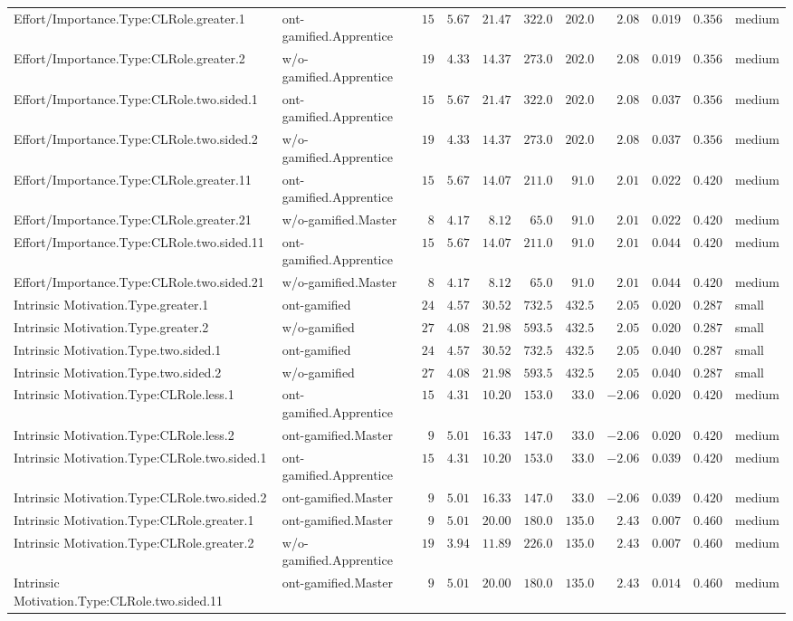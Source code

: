 \documentclass[6pt,a4paper]{article}
\begin{document}
\begin{landscape}
{\begin{longtable}{llrrrrrrrrl}
Effort/Importance.Type:CLRole.greater.1&ont-gamified.Apprentice&$15$&$5.67$&$21.47$&$322.0$&$202.0$&$ 2.08$&$0.019$&$0.356$&medium\tabularnewline
Effort/Importance.Type:CLRole.greater.2&w/o-gamified.Apprentice&$19$&$4.33$&$14.37$&$273.0$&$202.0$&$ 2.08$&$0.019$&$0.356$&medium\tabularnewline
Effort/Importance.Type:CLRole.two.sided.1&ont-gamified.Apprentice&$15$&$5.67$&$21.47$&$322.0$&$202.0$&$ 2.08$&$0.037$&$0.356$&medium\tabularnewline
Effort/Importance.Type:CLRole.two.sided.2&w/o-gamified.Apprentice&$19$&$4.33$&$14.37$&$273.0$&$202.0$&$ 2.08$&$0.037$&$0.356$&medium\tabularnewline
Effort/Importance.Type:CLRole.greater.11&ont-gamified.Apprentice&$15$&$5.67$&$14.07$&$211.0$&$ 91.0$&$ 2.01$&$0.022$&$0.420$&medium\tabularnewline
Effort/Importance.Type:CLRole.greater.21&w/o-gamified.Master&$ 8$&$4.17$&$ 8.12$&$ 65.0$&$ 91.0$&$ 2.01$&$0.022$&$0.420$&medium\tabularnewline
Effort/Importance.Type:CLRole.two.sided.11&ont-gamified.Apprentice&$15$&$5.67$&$14.07$&$211.0$&$ 91.0$&$ 2.01$&$0.044$&$0.420$&medium\tabularnewline
Effort/Importance.Type:CLRole.two.sided.21&w/o-gamified.Master&$ 8$&$4.17$&$ 8.12$&$ 65.0$&$ 91.0$&$ 2.01$&$0.044$&$0.420$&medium\tabularnewline
Intrinsic Motivation.Type.greater.1&ont-gamified&$24$&$4.57$&$30.52$&$732.5$&$432.5$&$ 2.05$&$0.020$&$0.287$&small\tabularnewline
Intrinsic Motivation.Type.greater.2&w/o-gamified&$27$&$4.08$&$21.98$&$593.5$&$432.5$&$ 2.05$&$0.020$&$0.287$&small\tabularnewline
\newpage
Intrinsic Motivation.Type.two.sided.1&ont-gamified&$24$&$4.57$&$30.52$&$732.5$&$432.5$&$ 2.05$&$0.040$&$0.287$&small\tabularnewline
Intrinsic Motivation.Type.two.sided.2&w/o-gamified&$27$&$4.08$&$21.98$&$593.5$&$432.5$&$ 2.05$&$0.040$&$0.287$&small\tabularnewline
Intrinsic Motivation.Type:CLRole.less.1&ont-gamified.Apprentice&$15$&$4.31$&$10.20$&$153.0$&$ 33.0$&$-2.06$&$0.020$&$0.420$&medium\tabularnewline
Intrinsic Motivation.Type:CLRole.less.2&ont-gamified.Master&$ 9$&$5.01$&$16.33$&$147.0$&$ 33.0$&$-2.06$&$0.020$&$0.420$&medium\tabularnewline
Intrinsic Motivation.Type:CLRole.two.sided.1&ont-gamified.Apprentice&$15$&$4.31$&$10.20$&$153.0$&$ 33.0$&$-2.06$&$0.039$&$0.420$&medium\tabularnewline
Intrinsic Motivation.Type:CLRole.two.sided.2&ont-gamified.Master&$ 9$&$5.01$&$16.33$&$147.0$&$ 33.0$&$-2.06$&$0.039$&$0.420$&medium\tabularnewline
Intrinsic Motivation.Type:CLRole.greater.1&ont-gamified.Master&$ 9$&$5.01$&$20.00$&$180.0$&$135.0$&$ 2.43$&$0.007$&$0.460$&medium\tabularnewline
Intrinsic Motivation.Type:CLRole.greater.2&w/o-gamified.Apprentice&$19$&$3.94$&$11.89$&$226.0$&$135.0$&$ 2.43$&$0.007$&$0.460$&medium\tabularnewline
Intrinsic Motivation.Type:CLRole.two.sided.11&ont-gamified.Master&$ 9$&$5.01$&$20.00$&$180.0$&$135.0$&$ 2.43$&$0.014$&$0.460$&medium\tabularnewline

\end{longtable}}
\end{landscape}
\end{document}
